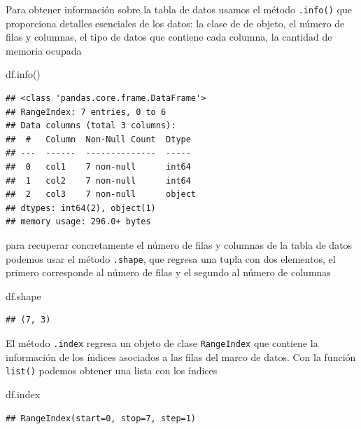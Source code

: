 \documentclass[
]{book}
\newenvironment{Shaded}{\begin{snugshade}}{\end{snugshade}}
\newcommand{\NormalTok}[1]{#1}
\theoremstyle{definition}
\theoremstyle{definition}
\theoremstyle{definition}
\theoremstyle{definition}
\theoremstyle{remark}
\begin{document}
Para obtener información sobre la tabla de datos usamos el método \texttt{.info()} que proporciona detalles esenciales de los datos: la clase de de objeto, el número de filas y columnas, el tipo de datos que contiene cada columna, la cantidad de memoria ocupada

\begin{Shaded}
\begin{Highlighting}[]
\NormalTok{df.info()}
\end{Highlighting}
\end{Shaded}

\begin{verbatim}
## <class 'pandas.core.frame.DataFrame'>
## RangeIndex: 7 entries, 0 to 6
## Data columns (total 3 columns):
##  #   Column  Non-Null Count  Dtype 
## ---  ------  --------------  ----- 
##  0   col1    7 non-null      int64 
##  1   col2    7 non-null      int64 
##  2   col3    7 non-null      object
## dtypes: int64(2), object(1)
## memory usage: 296.0+ bytes
\end{verbatim}

para recuperar concretamente el número de filas y columnas de la tabla de datos podemos usar el método \texttt{.shape}, que regresa una tupla con dos elementos, el primero corresponde al número de filas y el segundo al número de columnas

\begin{Shaded}
\begin{Highlighting}[]
\NormalTok{df.shape }
\end{Highlighting}
\end{Shaded}

\begin{verbatim}
## (7, 3)
\end{verbatim}

El método \texttt{.index} regresa un objeto de clase \texttt{RangeIndex} que contiene la información de los índices asociados a las filas del marco de datos. Con la función \texttt{list()} podemos obtener una lista con los índices

\begin{Shaded}
\begin{Highlighting}[]
\NormalTok{df.index}
\end{Highlighting}
\end{Shaded}

\begin{verbatim}
## RangeIndex(start=0, stop=7, step=1)
\end{verbatim}
\end{document}
